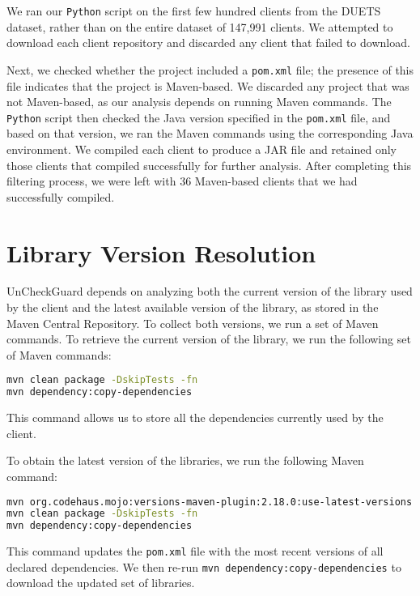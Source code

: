 We ran our \texttt{Python} script on the first few hundred clients from the DUETS dataset, rather than on the entire dataset of 147,991 clients. We attempted to download each client repository and discarded any client that failed to download. 

Next, we checked whether the project included a \texttt{pom.xml} file; the presence of this file indicates that the project is Maven-based. We discarded any project that was not Maven-based, as our analysis depends on running Maven commands. The \texttt{Python} script then checked the Java version specified in the \texttt{pom.xml} file, and based on that version, we ran the Maven commands using the corresponding Java environment. We compiled each client to produce a JAR file and retained only those clients that compiled successfully for further analysis. After completing this filtering process, we were left with 36 Maven-based clients that we had successfully compiled.


\section{Library Version Resolution}


UnCheckGuard depends on analyzing both the current version of the library used by the client and the latest available version of the library, as stored in the Maven Central Repository. To collect both versions, we run a set of Maven commands. To retrieve the current version of the library, we run the following set of Maven commands:

\begin{lstlisting}[language=bash]
mvn clean package -DskipTests -fn
mvn dependency:copy-dependencies
\end{lstlisting}

This command allows us to store all the dependencies currently used by the client.

To obtain the latest version of the libraries, we run the following Maven command:
\begin{lstlisting}[language=bash]
mvn org.codehaus.mojo:versions-maven-plugin:2.18.0:use-latest-versions
mvn clean package -DskipTests -fn
mvn dependency:copy-dependencies
\end{lstlisting}
This command updates the \texttt{pom.xml} file with the most recent versions of all declared dependencies. We then re-run \texttt{mvn dependency:copy-dependencies} to download the updated set of libraries.

